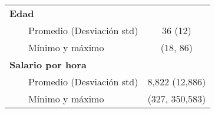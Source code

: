 \begin{longtable}{lc}
\textbf{Edad} &  \\ 
    Promedio (Desviación std) & 36 (12) \\ 
    Mínimo y máximo & (18, 86) \\ 
\textbf{Salario por hora}                                                                                                                                                                                                                                                                                                                                                                                                                                                                                                                                                                                                                                                                                                                                                                                                                                                                                                                             &  \\ 
    Promedio (Desviación std) & 8,822 (12,886) \\ 
    Mínimo y máximo & (327, 350,583) \\ 
\bottomrule
\end{longtable}

